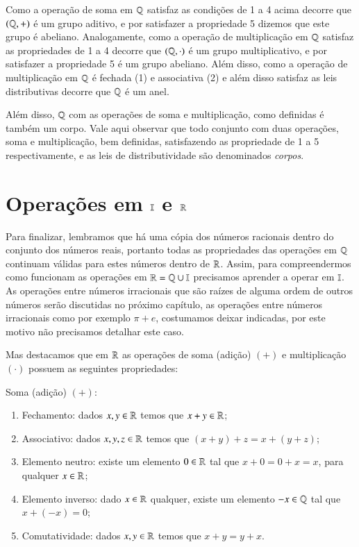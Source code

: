   Como a operação de soma em $\mathbb{Q}$ satisfaz as condições de 1 a 4 acima decorre que $(\mathbb{Q}, +)$ é um grupo aditivo, e por satisfazer a propriedade 5 dizemos que este grupo é abeliano. Analogamente, como a operação de multiplicação em $\mathbb{Q}$ satisfaz as propriedades de 1 a 4 decorre que $(\mathbb{Q}, \cdot)$ é um grupo multiplicativo, e por satisfazer a propriedade 5 é um grupo abeliano. Além disso, como a operação de multiplicação em $\mathbb{Q}$ é fechada (1) e associativa (2) e além disso satisfaz as leis distributivas decorre que $\mathbb{Q}$ é um anel. 
  
  Além disso, $\mathbb{Q}$ com as operações de soma e multiplicação, como definidas é também um corpo. Vale aqui observar que todo conjunto com duas operações, soma e multiplicação, bem definidas, satisfazendo as propriedade de 1 a 5 respectivamente, e as leis de distributividade são denominados \emph{corpos}. 
 
 \section{Operações em \texorpdfstring{$\mathbb{I}$}{I} e \texorpdfstring{$\mathbb{R}$}{R}}
 
 Para finalizar, lembramos que há uma cópia dos números racionais dentro do conjunto dos números reais, portanto todas as propriedades das operações em $\mathbb{Q}$ continuam válidas para estes números dentro de $\mathbb{R}$. Assim, para compreendermos como funcionam as operações em $\mathbb{R}= \mathbb{Q} \cup \mathbb{I}$ precisamos aprender a operar em $\mathbb{I}$. As operações entre números irracionais que são raízes de alguma ordem de outros números serão discutidas no próximo capítulo, as operações entre números irracionais como por exemplo $\pi + e$, costumamos deixar indicadas, por este motivo não precisamos detalhar este caso.
 
 Mas destacamos que em $\mathbb{R}$ as operações de soma (adição) $(+)$ e multiplicação $(\cdot)$ possuem as seguintes propriedades:
 
 Soma (adição) $(+)$:
 \begin{enumerate}[1)]
 \item Fechamento: dados $x, y \in \mathbb{R}$ temos que $x+y \in \mathbb{R}$;
 \item Associativo: dados $x, y, z \in \mathbb{R}$ temos que $(x+y)+z= x+(y+z)$;
 \item Elemento neutro: existe um elemento $0 \in \mathbb{R}$ tal que $x+0=0+x=x$, para qualquer $x \in \mathbb{R}$;
 \item Elemento inverso: dado $x \in \mathbb{R}$ qualquer, existe um elemento $-x \in \mathbb{Q}$ tal que $x+(-x)=0$;
 \item Comutatividade: dados $x, y \in \mathbb{R}$ temos que $x+y= y+x$. 
 \end{enumerate}
 
